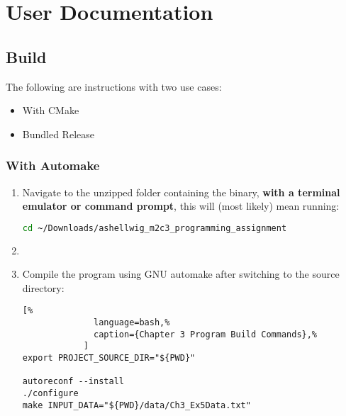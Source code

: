\documentclass[a4paper, 11pt]{article}
\begin{document}
  \newpage
  \section{User Documentation}

    \subsection{Build}
      The following are instructions with two use cases:
      \begin{itemize}
        \item With CMake
        \item Bundled Release
      \end{itemize}
      \subsubsection{With Automake}
        \begin{enumerate}
          \item Navigate to the unzipped folder containing the binary,
            \textbf{with a terminal emulator or command prompt}, this will
            (most likely) mean running:
            \begin{lstlisting}[language=bash]
cd ~/Downloads/ashellwig_m2c3_programming_assignment
            \end{lstlisting}
          \item
          \item Compile the program using GNU automake after switching to the
            source directory:
            \begin{lstlisting}[%
              language=bash,%
              caption={Chapter 3 Program Build Commands},%
            ]
export PROJECT_SOURCE_DIR="${PWD}"

autoreconf --install
./configure
make INPUT_DATA="${PWD}/data/Ch3_Ex5Data.txt"
            \end{lstlisting}
          \end{enumerate}
\end{document}
